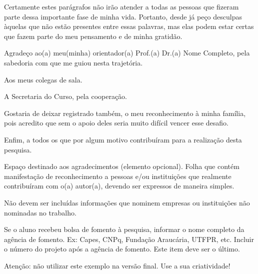 \begin{agradecimentos}%
    Certamente estes parágrafos não irão atender a todas as pessoas que fizeram parte dessa importante fase de minha vida. Portanto, desde já peço desculpas àquelas que não estão presentes entre essas palavras, mas elas podem estar certas que fazem parte do meu pensamento e de minha gratidão.

    Agradeço ao(a) meu(minha) orientador(a) Prof.(a) Dr.(a) Nome Completo, pela sabedoria com que me guiou nesta trajetória.

    Aos meus colegas de sala.

    A Secretaria do Curso, pela cooperação.

    Gostaria de deixar registrado também, o meu reconhecimento à minha família, pois acredito que sem o apoio deles seria muito difícil vencer esse desafio.

    Enfim, a todos os que por algum motivo contribuíram para a realização desta pesquisa.


    Espaço destinado aos agradecimentos (elemento opcional). Folha que contém manifestação de reconhecimento a pessoas e/ou instituições que realmente contribuíram com o(a) autor(a), devendo ser expressos de maneira simples.

    Não devem ser incluídas informações que nominem empresas ou instituições não nominadas no trabalho.

    Se o aluno recebeu bolsa de fomento à pesquisa, informar o nome completo da agência de fomento. Ex: Capes, CNPq, Fundação Araucária, UTFPR, etc. Incluir o número do projeto após a agência de fomento. Este item deve ser o último.

    Atenção: não utilizar este exemplo na versão final. Use a sua criatividade!
\end{agradecimentos}
